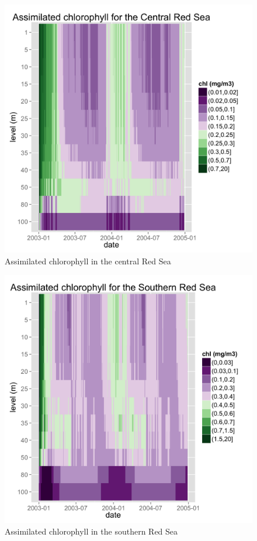 \begin{figure}
    \centering
    \includegraphics[scale=.13]{figures/chl1.png}
    \caption{Assimilated chlorophyll in the central Red Sea}
    \label{chl1}
\end{figure}

\begin{figure}
    \centering
    \includegraphics[scale=.13]{figures/chl3.png}
    \caption{Assimilated chlorophyll in the southern Red Sea}
    \label{chl3}
\end{figure}

